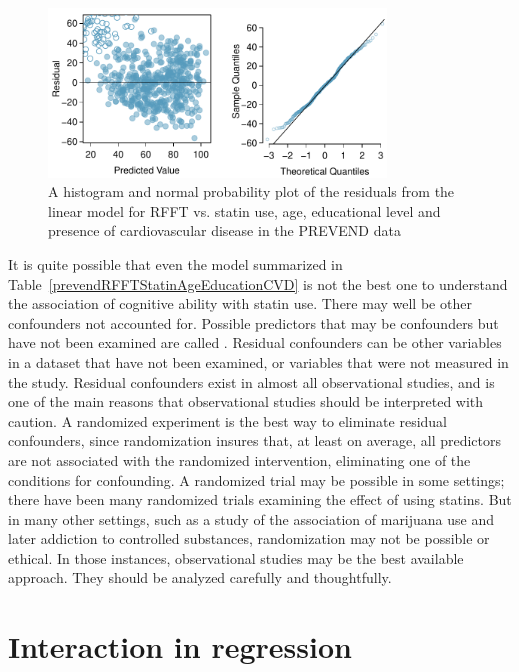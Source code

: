 \begin{figure}[h!]
	\centering
	\includegraphics[width=0.8\textwidth]
	{ch_multiple_linear_regression_oi_biostat/figures/prevendRFFTStatinAgeEducCVDResidNormPlot/prevendRFFTStatinAgeEducCVDResidNormPlot.pdf}
	\caption{A histogram and normal probability plot of the residuals from the linear model for RFFT vs. statin use, age, educational level and presence of cardiovascular disease in the PREVEND data}
	\label{prevendRFFTStatinAgeEducCVDResidNormPlot}
\end{figure}

It is quite possible that even the model summarized in Table~\ref{prevendRFFTStatinAgeEducationCVD} is not the best one to understand the association of cognitive ability with statin use.  There may well be other confounders not accounted for.  Possible predictors that may be confounders but have not been examined are called .  Residual confounders can be other variables in a dataset that have not been examined, or variables that were not measured in the study.  Residual confounders exist in almost all observational studies, and is one of the main reasons that observational studies should be interpreted with caution.  A randomized experiment is the best way to eliminate residual confounders, since randomization insures that, at least on average, all predictors are not associated with the randomized intervention, eliminating one of the conditions for confounding.  A randomized trial may be possible in some settings; there have been many randomized trials examining the effect of using statins. But in many other settings, such as a study of the association of marijuana use and later addiction to controlled substances, randomization may not be possible or ethical.  In those instances, observational studies may be the best available approach. They should be analyzed carefully and thoughtfully.

\section{Interaction in regression}

